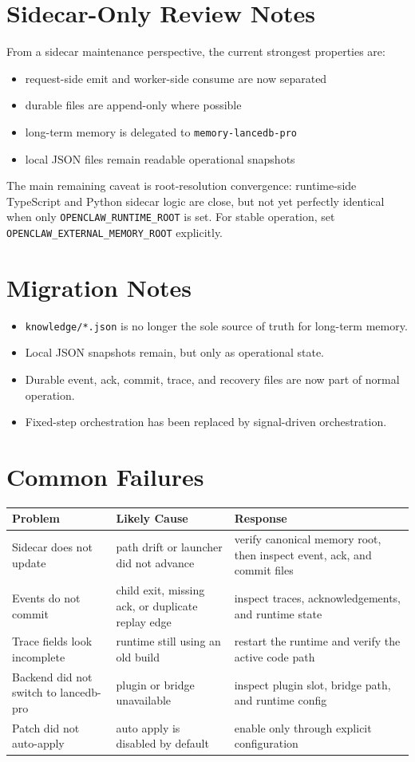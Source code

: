 \documentclass[11pt,a4paper,oneside,openany]{book}
\begin{document}
\chapter{Sidecar-Only Review Notes}
From a sidecar maintenance perspective, the current strongest properties are:
\begin{itemize}
  \item request-side emit and worker-side consume are now separated
  \item durable files are append-only where possible
  \item long-term memory is delegated to \texttt{memory-lancedb-pro}
  \item local JSON files remain readable operational snapshots
\end{itemize}
The main remaining caveat is root-resolution convergence: runtime-side TypeScript and Python sidecar logic are close, but not yet perfectly identical when only \texttt{OPENCLAW\_RUNTIME\_ROOT} is set. For stable operation, set \texttt{OPENCLAW\_EXTERNAL\_MEMORY\_ROOT} explicitly.
\chapter{Migration Notes}
\begin{itemize}
  \item \texttt{knowledge/*.json} is no longer the sole source of truth for long-term memory.
  \item Local JSON snapshots remain, but only as operational state.
  \item Durable event, ack, commit, trace, and recovery files are now part of normal operation.
  \item Fixed-step orchestration has been replaced by signal-driven orchestration.
\end{itemize}
\chapter{Common Failures}
\begin{longtable}{p{}p{}p{}}
\toprule
\textbf{Problem} & \textbf{Likely Cause} & \textbf{Response}\\
\midrule
\endhead
Sidecar does not update & path drift or launcher did not advance & verify canonical memory root, then inspect event, ack, and commit files\\
Events do not commit & child exit, missing ack, or duplicate replay edge & inspect traces, acknowledgements, and runtime state\\
Trace fields look incomplete & runtime still using an old build & restart the runtime and verify the active code path\\
Backend did not switch to lancedb-pro & plugin or bridge unavailable & inspect plugin slot, bridge path, and runtime config\\
Patch did not auto-apply & auto apply is disabled by default & enable only through explicit configuration\\
\bottomrule
\end{longtable}
\end{document}
